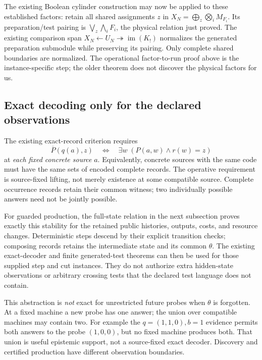 \documentclass[11pt,a4paper]{article}
\theoremstyle{definition}
\begin{document}
The existing Boolean cylinder construction \cite{Cylinder} may now be
applied to these established factors: retain all shared assignments $z$ in
$X_N=\bigoplus_z\bigotimes_i M_{F_i}$. Its preparation/test pairing is
$\bigvee_z\bigwedge_i F_i$, the physical relation just proved. The existing
comparison span $X_N\leftarrow U_N\twoheadrightarrow\operatorname{im}(K_!)$
normalizes the generated preparation submodule while preserving its pairing.
Only complete shared boundaries are normalized. The operational
factor-to-run proof above is the instance-specific step; the older theorem
does not discover the physical factors for us.

\subsection{Exact decoding only for the declared observations}

The existing exact-record criterion \cite{Decoder} requires
\[
 \overline P(q(a),z)\quad\Longleftrightarrow\quad
 \exists w\;(P(a,w)\land r(w)=z)
\]
at \emph{each fixed concrete source} $a$. Equivalently, concrete sources
with the same code must have the same sets of encoded complete records.
The operative requirement is source-fixed lifting, not merely existence
at some compatible source. Complete occurrence records retain their common
witness; two individually possible answers need not be jointly possible.

For guarded production, the full-state relation in the next subsection
proves exactly this stability for the retained public histories, outputs,
costs, and resource changes. Deterministic steps descend by their explicit
transition checks; composing records retains the intermediate state and
its common $\theta$. The existing exact-decoder and finite generated-test
theorems can then be used for those supplied step and cut instances. They
do not authorize extra hidden-state observations or arbitrary crossing
tests that the declared test language does not contain.

This abstraction is \emph{not} exact for unrestricted future probes when
$\theta$ is forgotten. At a fixed machine a new probe has one answer;
the union over compatible machines may contain two. For example the
$q=(1,1,0), b=1$ evidence permits both answers to the probe $(1,0,0)$,
but no fixed machine produces both. That union is useful epistemic support,
not a source-fixed exact decoder. Discovery and certified production have
different observation boundaries.
\end{document}
